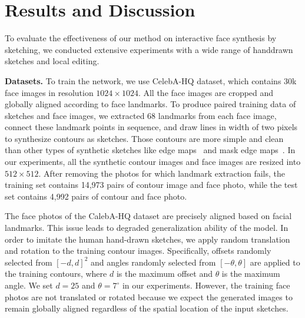 \section{Results and Discussion}

To evaluate the effectiveness of our method on interactive face synthesis by sketching, we conducted extensive experiments with a wide range of handdrawn sketches and local editing. 
 
\noindent
\textbf{Datasets.} 
To train the network, we use CelebA-HQ dataset, which contains 30k face images in resolution $1024\times1024$. All the face images are cropped and globally aligned according to face landmarks.
To produce paired training data of sketches and face images, we extracted 68 landmarks from each face image, connect these landmark points in sequence, and draw lines in width of two pixels to synthesize contours as sketches.
Those contours are more simple and clean than other types of synthetic sketches like edge maps~\cite{csagan} and mask edge maps~\cite{maskgan}. 
In our experiments, all the synthetic contour images and face images are resized into $512\times512$. 
After removing the photos for which landmark extraction fails, the training set contains 14,973 pairs of contour image and face photo, while the test set contains 4,992 pairs of contour and face photo. 

The face photos of the CalebA-HQ dataset are precisely aligned based on facial landmarks. 
This issue leads to degraded generalization ability of the model.
%
In order to imitate the human hand-drawn sketches, we apply random translation and rotation to the training contour images. 
Specifically, offsets randomly selected from $[-d,d]^2$ and angles randomly selected from $[-\theta,\theta]$ are applied to the training contours, where $d$ is the maximum offset and $\theta$ is the maximum angle.
We set $d=25$ and $\theta=7^\circ$ in our experiments. 
However, the training face photos are not translated or rotated because we expect the generated images to remain globally aligned regardless of the spatial location of the input sketches.

